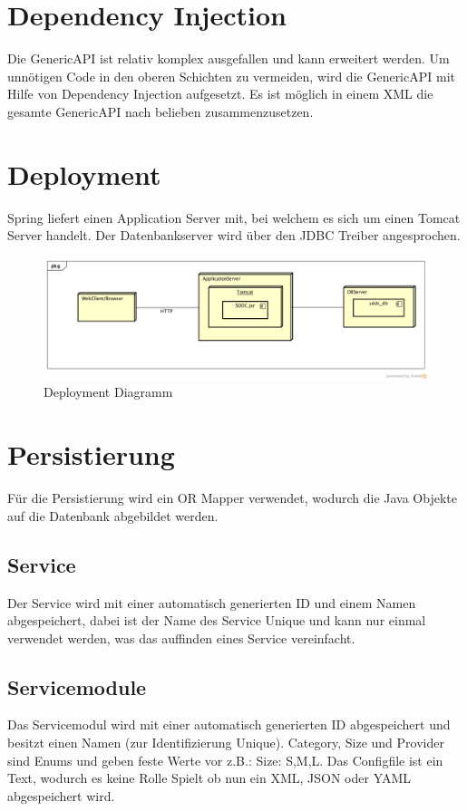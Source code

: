 \section{Dependency Injection}

Die \gls{GenericAPI} ist relativ komplex ausgefallen und kann erweitert werden. Um unnötigen 
Code in den oberen Schichten zu vermeiden, wird die \gls{GenericAPI} mit Hilfe von Dependency
 Injection aufgesetzt. Es ist möglich in einem XML die gesamte GenericAPI nach belieben zusammenzusetzen.

\section{Deployment}

Spring liefert einen Application Server mit, bei welchem es sich um einen Tomcat 
Server handelt. Der Datenbankserver wird über den \ac{JDBC} Treiber angesprochen.

\begin{figure}[h]
\includegraphics[width=\textwidth]{./05_Design/04_Architektur/deployment}
\caption{Deployment Diagramm}
\end{figure}

\section{Persistierung}
Für die Persistierung wird ein OR Mapper verwendet, wodurch die Java 
Objekte auf die Datenbank abgebildet werden.

\subsection{Service}
Der Service wird mit einer automatisch generierten ID und einem Namen 
abgespeichert, dabei ist der Name des Service Unique und kann nur einmal 
verwendet werden, was das auffinden eines Service vereinfacht.

\subsection{Servicemodule}
Das Servicemodul wird mit einer automatisch generierten ID abgespeichert und besitzt einen 
Namen (zur Identifizierung Unique).
Category, Size und Provider sind Enums und geben feste Werte vor z.B.: Size: 
S,M,L.
Das Configfile ist ein Text, wodurch es keine Rolle Spielt ob nun ein \ac{XML}, \ac{JSON} 
oder \ac{YAML} abgespeichert wird.

